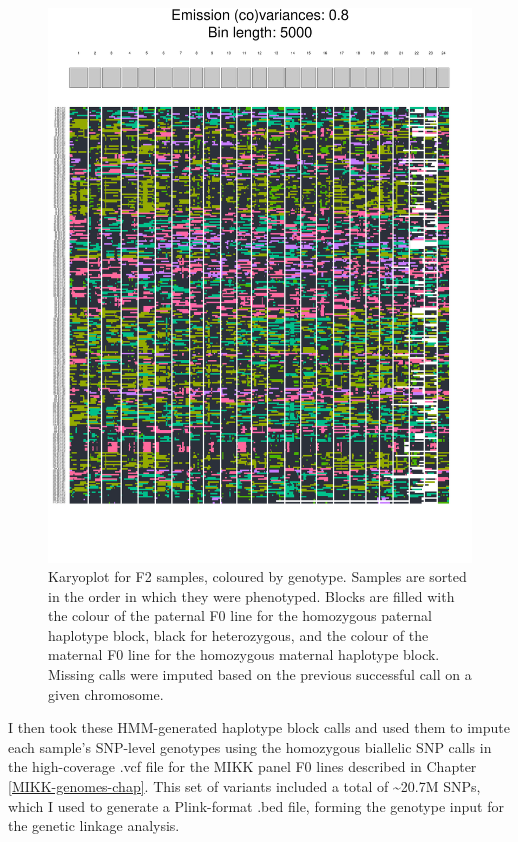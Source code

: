 \documentclass[
]{article}
\begin{document}
\begin{figure}
\includegraphics[width=1\linewidth]{figs/mikk_behaviour/karyoplot_no_missing} \caption{Karyoplot for F2 samples, coloured by genotype. Samples are sorted in the order in which they were phenotyped. Blocks are filled with the colour of the paternal F0 line for the homozygous paternal haplotype block, black for heterozygous, and the colour of the maternal F0 line for the homozygous maternal haplotype block. Missing calls were imputed based on the previous successful call on a given chromosome.}\label{fig:F2-recomb-blocks}
\end{figure}

I then took these HMM-generated haplotype block calls and used them to impute each sample's SNP-level genotypes using the homozygous biallelic SNP calls in the high-coverage .vcf file for the MIKK panel F0 lines described in Chapter \ref{MIKK-genomes-chap}. This set of variants included a total of \textasciitilde20.7M SNPs, which I used to generate a Plink-format .bed file, forming the genotype input for the genetic linkage analysis.
\end{document}
